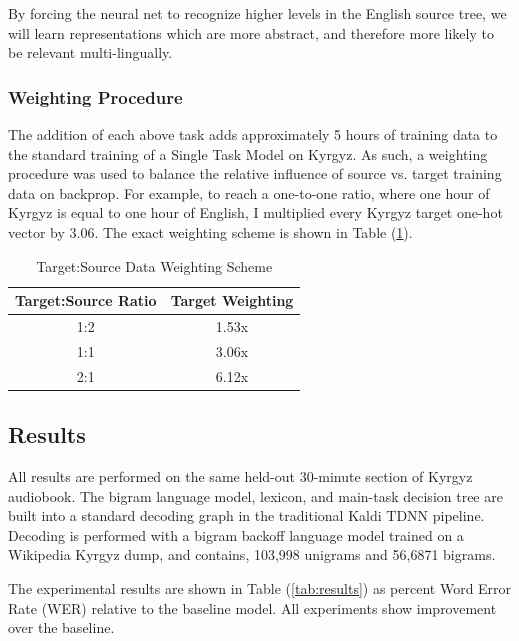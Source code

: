 \documentclass[a4paper]{article}
\begin{document}
By forcing the neural net to recognize higher levels in the English source tree, we will learn representations which are more abstract, and therefore more likely to be relevant multi-lingually. 


\subsubsection{Weighting Procedure}

The addition of each above task adds approximately 5 hours of training data to the standard training of a Single Task Model on Kyrgyz. As such, a weighting procedure was used to balance the relative influence of source vs. target training data on backprop. For example, to reach a one-to-one ratio, where one hour of Kyrgyz is equal to one hour of English, I multiplied every Kyrgyz target one-hot vector by $3.06$. The exact weighting scheme is shown in Table (\ref{tab:weights}).

\begin{table}[!htbp]
  \centering
  \caption{Target:Source Data Weighting Scheme}
  \label{tab:weights}
  \begin{adjustbox}{width=.3\textwidth}
    \begin{tabular}{cc}
      \toprule
      \textbf{Target:Source Ratio} & \textbf{Target Weighting}\\
      \midrule
      1:2 & 1.53x  \\
      1:1 & 3.06x  \\
      2:1 & 6.12x  \\
      \bottomrule
    \end{tabular}
  \end{adjustbox}
\end{table}




\subsection{Results}


All results are performed on the same held-out 30-minute section of Kyrgyz audiobook. The bigram language model, lexicon, and main-task decision tree are built into a standard decoding graph in the traditional Kaldi TDNN pipeline. Decoding is performed with a bigram backoff language model trained on a Wikipedia Kyrgyz dump, and contains, 103,998 unigrams and 56,6871 bigrams.

The experimental results are shown in Table (\ref{tab:results}) as percent Word Error Rate (WER) relative to the baseline model. All experiments show improvement over the baseline.
\end{document}
